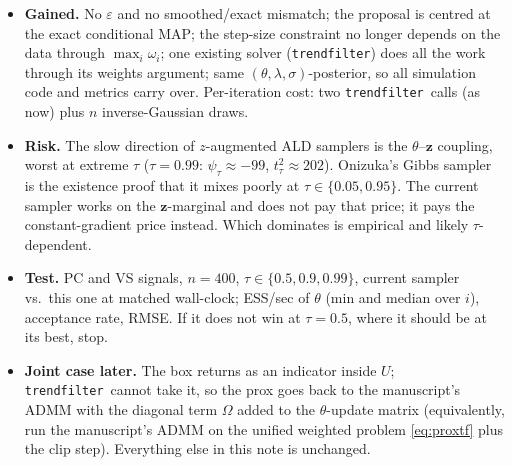 \documentclass[12pt]{article}
\newcommand{\bz}{\bm{z}}
\newcommand{\tf}{\texttt{trendfilter}}
\begin{document}
\begin{itemize}
\item \textbf{Gained.} No $\varepsilon$ and no smoothed/exact mismatch; the proposal is centred
at the exact conditional MAP; the step-size constraint no longer depends on the data through
$\max_i\omega_i$; one existing solver (\tf) does all the work through its weights argument; same
$(\theta,\lambda,\sigma)$-posterior, so all simulation code and metrics carry over. Per-iteration
cost: two \tf\ calls (as now) plus $n$ inverse-Gaussian draws.
\item \textbf{Risk.} The slow direction of $z$-augmented ALD samplers is the $\theta$--$\bz$ coupling,
worst at extreme $\tau$ ($\tau=0.99$: $\psi_\tau\approx-99$, $t_\tau^2\approx202$). Onizuka's Gibbs
sampler is the existence proof that it mixes poorly at $\tau\in\{0.05,0.95\}$. The current
sampler works on the $\bz$-marginal and does not pay that price; it pays the constant-gradient
price instead. Which dominates is empirical and likely $\tau$-dependent.
\item \textbf{Test.} PC and VS signals, $n=400$, $\tau\in\{0.5,0.9,0.99\}$, current sampler vs.\ this
one at matched wall-clock; ESS/sec of $\theta$ (min and median over $i$), acceptance rate, RMSE.
If it does not win at $\tau=0.5$, where it should be at its best, stop.
\item \textbf{Joint case later.} The box returns as an indicator inside $U$; \tf\ cannot take it,
so the prox goes back to the manuscript's ADMM with the diagonal term $\Omega$ added to the
$\theta$-update matrix (equivalently, run the manuscript's ADMM on the unified weighted problem
\eqref{eq:proxtf} plus the clip step). Everything else in this note is unchanged.
\end{itemize}
\end{document}
